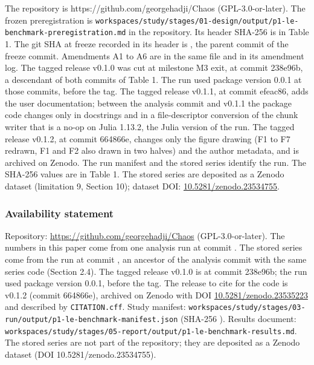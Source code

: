 \documentclass[
  11pt,
]{article}
\begin{document}
The repository is https://github.com/georgehadji/Chaos
(GPL-3.0-or-later). The frozen preregistration is
\texttt{workspaces/study/stages/01-design/output/p1-le-benchmark-preregistration.md}
in the repository. Its header SHA-256 is in Table 1. The git SHA at
freeze recorded in its header is
, the parent commit of the
freeze commit. Amendments A1 to A6 are in the same file and in its
amendment log. The tagged release v0.1.0 was cut at milestone M3 exit,
at commit 238e96b, a descendant of both commits of Table 1. The run used
package version 0.0.1 at those commits, before the tag. The tagged
release v0.1.1, at commit efeac86, adds the user documentation; between
the analysis commit and v0.1.1 the package code changes only in
docstrings and in a file-descriptor conversion of the chunk writer that
is a no-op on Julia 1.13.2, the Julia version of the run. The tagged
release v0.1.2, at commit 664866e, changes only the figure drawing (F1
to F7 redrawn, F1 and F2 also drawn in two halves) and the author
metadata, and is archived on Zenodo. The run manifest and the stored
series identify the run. The SHA-256 values are in Table 1. The stored
series are deposited as a Zenodo dataset (limitation 9, Section 10);
dataset DOI:
\href{https://doi.org/10.5281/zenodo.23534755}{10.5281/zenodo.23534755}.

\subsubsection{Availability statement}\label{availability-statement}

Repository: \url{https://github.com/georgehadji/Chaos}
(GPL-3.0-or-later). The numbers in this paper come from one analysis run
at commit . The stored series
come from the run at commit , an
ancestor of the analysis commit with the same series code (Section 2.4).
The tagged release v0.1.0 is at commit 238e96b; the run used package
version 0.0.1, before the tag. The release to cite for the code is
v0.1.2 (commit 664866e), archived on Zenodo with DOI
\href{https://doi.org/10.5281/zenodo.23535223}{10.5281/zenodo.23535223}
and described by \texttt{CITATION.cff}. Study manifest:
\texttt{workspaces/study/stages/03-run/output/p1-le-benchmark-manifest.json}
(SHA-256
).
Results document:
\texttt{workspaces/study/stages/05-report/output/p1-le-benchmark-results.md}.
The stored series are not part of the repository; they are deposited as
a Zenodo dataset (DOI 10.5281/zenodo.23534755).
\end{document}
